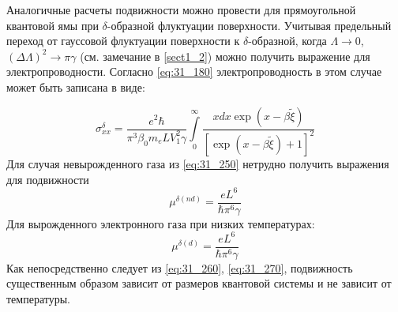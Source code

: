 Аналогичные расчеты подвижности можно провести для прямоугольной квантовой ямы при $\delta $-образной флуктуации поверхности. Учитывая предельный переход от гауссовой флуктуации поверхности к $\delta $-образной, когда $\Lambda \to 0$, ${\left(\Delta \Lambda \right)}^2\to \pi \gamma $ (см. замечание в \ref{sect1_2}) можно получить выражение для электропроводности. Согласно \eqref{eq:31_180} электропроводность в этом случае может быть записана в виде:

\begin{equation} \label{eq:31_250}
{\sigma }^{\delta }_{xx}=\frac{e^2\hbar }{{\pi }^3{\beta }_0m_eLV^2_1\gamma }\int\limits_0^\infty{\frac{x dx \exp{(x-\beta \widetilde{\xi })}}{{\left[ \exp{(x-\beta \widetilde{\xi })}+1 \right] }^2}}
\end{equation} 
Для случая невырожденного газа из \eqref{eq:31_250} нетрудно получить выражения для подвижности
\begin{equation} \label{eq:31_260}
{\mu }^{\delta \left(nd\right)}=\frac{eL^6}{\hbar {\pi }^6\gamma }
\end{equation}
Для вырожденного электронного газа при низких температурах:
\begin{equation} \label{eq:31_270}
{\mu }^{\delta \left(d\right)}=\frac{eL^6}{\hbar {\pi }^6\gamma }
\end{equation}
Как непосредственно следует из \eqref{eq:31_260}, \eqref{eq:31_270}, подвижность существенным образом зависит от размеров квантовой системы и не зависит от температуры.

